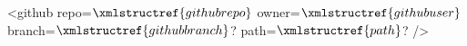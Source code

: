 <github repo=$\xmlstructref{githubrepo}$ owner=$\xmlstructref{githubuser}$ branch=$\xmlstructref{githubbranch}$? path=$\xmlstructref{path}$? />
